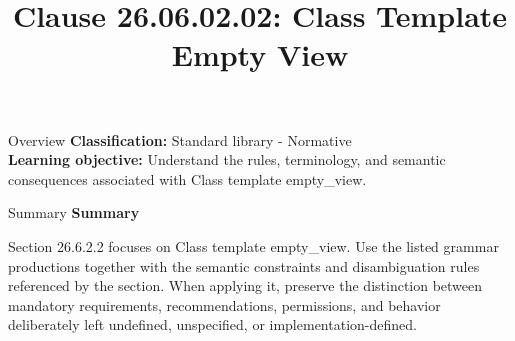 \documentclass[10pt,letterpaper]{article}
\title{Clause 26.06.02.02: Class Template Empty View}
\author{}
\date{}
\begin{document}
\maketitle
\begin{CornellOverviewBox}{Overview}
\textbf{Classification:} Standard library - Normative\\[2pt]
\textbf{Learning objective:} Understand the rules, terminology, and semantic consequences associated with Class template empty\_view.
\end{CornellOverviewBox}\begin{CornellSummaryBox}{Summary}
{\sffamily\bfseries\color{Accent} Summary}\par\vspace{3pt}Section 26.6.2.2 focuses on Class template empty\_view. Use the listed grammar productions together with the semantic constraints and disambiguation rules referenced by the section. When applying it, preserve the distinction between mandatory requirements, recommendations, permissions, and behavior deliberately left undefined, unspecified, or implementation-defined.
\end{CornellSummaryBox}
\end{document}
